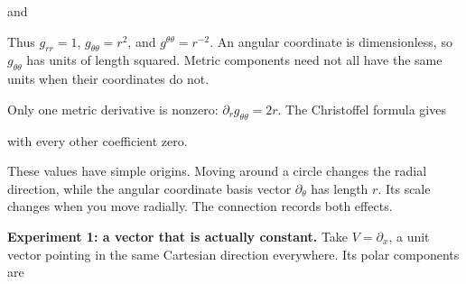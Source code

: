 \documentclass[
  11pt,
  letterpaper,
  oneside,
  openany]{scrbook}
\begin{document}
\begin{center}
\begingroup
{}
\ifdim\wd\grmathbox>\linewidth
\resizebox{\linewidth}{!}{\usebox{\grmathbox}}
\else\usebox{\grmathbox}\fi
\endgroup
\end{center}

and

\begin{center}
\begingroup
{}
\ifdim\wd\grmathbox>\linewidth
\resizebox{\linewidth}{!}{\usebox{\grmathbox}}
\else\usebox{\grmathbox}\fi
\endgroup
\end{center}

Thus \(g_{rr}=1\), \(g_{\theta\theta}=r^2\), and
\(g^{\theta\theta}=r^{-2}\). An angular coordinate is dimensionless, so
\(g_{\theta\theta}\) has units of length squared. Metric components need
not all have the same units when their coordinates do not.

Only one metric derivative is nonzero:
\(\partial_rg_{\theta\theta}=2r\). The Christoffel formula gives

\begin{center}
\begingroup
{}
\ifdim\wd\grmathbox>\linewidth
\resizebox{\linewidth}{!}{\usebox{\grmathbox}}
\else\usebox{\grmathbox}\fi
\endgroup
\end{center}

with every other coefficient zero.

These values have simple origins. Moving around a circle changes the
radial direction, while the angular coordinate basis vector
\(\partial_\theta\) has length \(r\). Its scale changes when you move
radially. The connection records both effects.

\textbf{Experiment 1: a vector that is actually constant.} Take
\(V=\partial_x\), a unit vector pointing in the same Cartesian direction
everywhere. Its polar components are

\begin{center}
\begingroup
{}
\ifdim\wd\grmathbox>\linewidth
\resizebox{\linewidth}{!}{\usebox{\grmathbox}}
\else\usebox{\grmathbox}\fi
\endgroup
\end{center}
\end{document}
